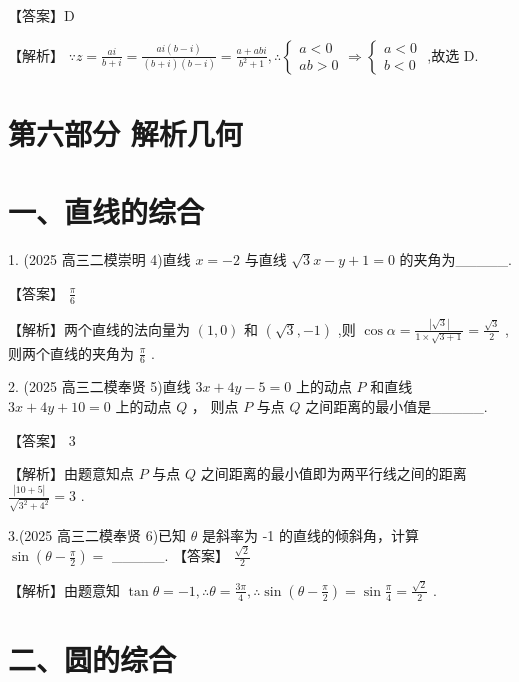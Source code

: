 \documentclass[10pt]{article}
\begin{document}
【答案】D

【解析】 \(\because z = \frac{ai}{b + i} = \frac{{ai}\left( {b - i}\right) }{\left( {b + i}\right) \left( {b - i}\right) } = \frac{a + {abi}}{{b}^{2} + 1},\therefore \left\{  {\begin{array}{l} a < 0 \\  {ab} > 0 \end{array} \Rightarrow  \left\{  \begin{array}{l} a < 0 \\  b < 0 \end{array}\right. }\right.\) ,故选 D.

\section*{第六部分 解析几何}

\section*{一、直线的综合}

1. (2025 高三二模崇明 4)直线 \(x =  - 2\) 与直线 \(\sqrt{3}x - y + 1 = 0\) 的夹角为\_\_\_\_\_.

【答案】 \(\frac{\pi }{6}\)

【解析】两个直线的法向量为 \(\left( {1,0}\right)\) 和 \(\left( {\sqrt{3}, - 1}\right)\) ,则 \(\cos \alpha  = \frac{\left| \sqrt{3}\right| }{1 \times  \sqrt{3 + 1}} = \frac{\sqrt{3}}{2}\) , 则两个直线的夹角为 \(\frac{\pi }{6}\) .

2. (2025 高三二模奉贤 5)直线 \({3x} + {4y} - 5 = 0\) 上的动点 \(P\) 和直线 \({3x} + {4y} + {10} = 0\) 上的动点 \(Q\) ， 则点 \(P\) 与点 \(Q\) 之间距离的最小值是\_\_\_\_\_.

【答案】 3

【解析】由题意知点 \(P\) 与点 \(Q\) 之间距离的最小值即为两平行线之间的距离 \(\frac{\left| {10} + 5\right| }{\sqrt{{3}^{2} + {4}^{2}}} = 3\) .

3.(2025 高三二模奉贤 6)已知 \(\theta\) 是斜率为 -1 的直线的倾斜角，计算 \(\sin \left( {\theta  - \frac{\pi }{2}}\right)  =\) \_\_\_\_\_. 【答案】 \(\frac{\sqrt{2}}{2}\)

【解析】由题意知 \(\tan \theta  =  - 1,\therefore \theta  = \frac{3\pi }{4},\therefore \sin \left( {\theta  - \frac{\pi }{2}}\right)  = \sin \frac{\pi }{4} = \frac{\sqrt{2}}{2}\) .

\section*{二、圆的综合}
\end{document}
